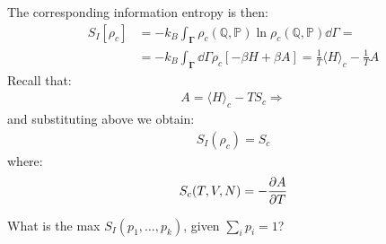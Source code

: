 \documentclass[../../main.tex]{subfiles}
\begin{document}
\begin{itemize}
    The corresponding information entropy is then:
    \begin{align*}
        S_I[\rho_c] &= -k_B \int_{\bm{\Gamma}} \rho_c (\mathbb{Q}, \mathbb{P}) \ln \rho_c(\mathbb{Q}, \mathbb{P}) \dd{\Gamma} = \\
        &= -k_B \int_{\bm{\Gamma}} \dd{\Gamma} \rho_c [-\beta H + \beta A] = \frac{1}{T} \langle H \rangle_c - \frac{1}{T} A 
    \end{align*}
    Recall that:
    \begin{align*}
        A = \langle H \rangle_c - T S_c \Rightarrow 
    \end{align*}
    and substituting above we obtain:
    \begin{align*}
        S_I(\rho_c) = S_c
    \end{align*}
    where:
    \begin{align*}
        S_c(T,V,N) = - \pdv{A}{T}(T,V,N)
    \end{align*}
\end{itemize}
What is the max $S_I(p_1, \dots, p_k)$, given $\sum_i p_i = 1$?

\end{document}
